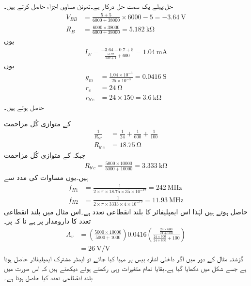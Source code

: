 حل:پہلے یک سمت  حل درکار ہے۔تھونن مساوی اجزاء حاصل  کرتے ہیں۔
\begin{align*}
V_{BB}&=\frac{5+5}{6000+38000} \times 6000-5=\SI{-3.64}{\volt}\\
R_B&=\frac{6000 \times 38000}{6000 +38000}=\SI{5.182}{\kilo \ohm}
\end{align*}
یوں
\begin{align*}
I_E=\frac{-3.64-0.7+5}{\frac{5182}{149+1}+600}=\SI{1.04}{\milli \ampere}
\end{align*}
یوں
\begin{align*}
g_m&=\frac{1.04 \times 10^{-3}}{25 \times 10^{-3}}=\SI{0.0416}{\siemens}\\
r_e&=\SI{24}{\ohm}\\
r_{b'e}&=24 \times 150=\SI{3.6}{\kilo \ohm}
\end{align*}
حاصل ہوتے ہیں۔

 کے متوازی کُل مزاحمت 
\begin{align*}
\frac{1}{R_{be'}}&=\frac{1}{24}+\frac{1}{600}+\frac{1}{100}\\
R_{b'e}&=\SI{18.75}{\ohm}
\end{align*}
جبکہ  کے متوازی کُل مزاحمت
\begin{align*}
R_{b'c}=\frac{5000 \times 10000}{5000+10000}=\SI{3.333}{\kilo \ohm}
\end{align*}
ہیں۔یوں مساوات  کی مدد سے
\begin{align*}
f_{H1}&=\frac{1}{2 \times \pi \times 18.75 \times 35 \times 10^{-12}}=\SI{242}{\mega \hertz}\\
f_{H2}&=\frac{1}{2 \times \pi \times 3333 \times 4 \times 10^{-12}}=\SI{11.93}{\mega \hertz}
\end{align*}
حاصل ہوتے ہیں لہٰذا اس ایمپلیفائر کا بلند انقطاعی تعدد  ہے۔اس مثال میں بلند انقطاعی تعدد کا دارومدار   پر ہے نا کہ  پر۔
\begin{align*}
A_v&=\left(\frac{5000 \times 10000}{5000+1000}\right) 0.0416 \left(\frac{\frac{24 \times 600}{24+600}}{\frac{24 \times 600}{24+600} +100} \right)\\
&=\SI{26}{\volt \per \volt}
\end{align*}
گزشتہ مثال کے دور میں اگر داخلی اشارہ بیس  پر مہیا کیا جائے تو ایمٹر        مشترک ایمپلیفائر حاصل ہوتا ہے جسے شکل  میں دکھایا گیا ہے۔بقایا تمام متغیرات وہی رکھتے ہوئے دیکھتے ہیں کہ اس صورت میں بلند انقطاعی تعدد کیا حاصل ہوتا ہے۔

